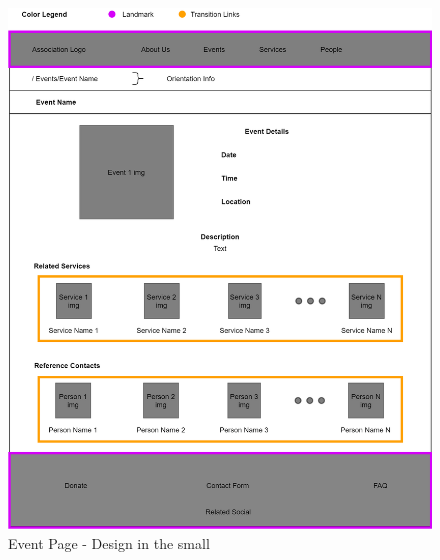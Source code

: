 \begin{figure}[h!]
		\centering
		\begin{minipage}[b]{1\textwidth}
    			\includegraphics[width=\textwidth]{./assets/eventdetails.png}
			\caption{Event Page - Design in the small}
		\end{minipage}
\end{figure}
\FloatBarrier
